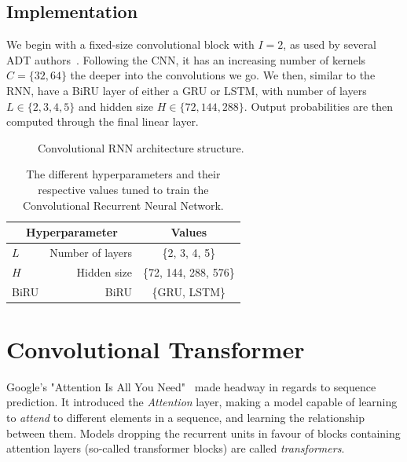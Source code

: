 \subsection{Implementation}

We begin with a fixed-size convolutional block with $I = 2$, as used by several \gls{ADT} authors~\cite{Vogl2017DrumTV, signals4040042}. Following the \gls{CNN}, it has an increasing number of kernels $C = \{32, 64\}$ the deeper into the convolutions we go. We then, similar to the \gls{RNN}, have a \gls{BiRU} layer of either a \gls{GRU} or \gls{LSTM}, with number of layers $L \in \{2, 3, 4, 5\}$ and hidden size $H \in \{72, 144, 288\}$. Output probabilities are then computed through the final linear layer.

\begin{figure}[H]
    \centering
    
    \caption{Convolutional RNN architecture structure.}
    \label{CRNNFigure}
\end{figure}

\begin{table}[H]
    \centering
    \begin{tabular}{lr|c}
        \multicolumn{2}{c|}{Hyperparameter} & Values       \\
        \hline
        $L$ & Number of layers      & \{2, 3, 4, 5\} \\
        $H$ & Hidden size      & \{72, 144, 288, 576\} \\
        \gls{BiRU} & \acrlong{BiRU} & \{\gls{GRU}, \gls{LSTM}\}\\
    \end{tabular}
    \caption{The different hyperparameters and their respective values tuned to train the Convolutional Recurrent Neural Network.}
    \label{CRNNHyperparams}
\end{table}

\section{Convolutional Transformer}

Google's "Attention Is All You Need"~\cite{NIPS2017_3f5ee243} made headway in regards to sequence prediction. It introduced the \textit{Attention} layer, making a model capable of learning to \textit{attend} to different elements in a sequence, and learning the relationship between them. Models dropping the recurrent units in favour of blocks containing attention layers (so-called transformer blocks) are called \textit{transformers}.

